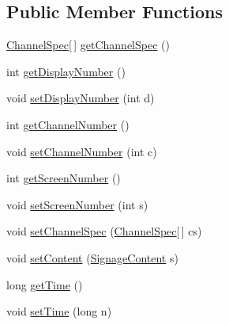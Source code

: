 \subsection*{Public Member Functions}
\begin{DoxyCompactItemize}
\item 
\hyperlink{classgov_1_1fnal_1_1ppd_1_1dd_1_1xml_1_1ChannelSpec}{Channel\-Spec}\mbox{[}$\,$\mbox{]} \hyperlink{classgov_1_1fnal_1_1ppd_1_1dd_1_1xml_1_1messages_1_1ChangeChannelList_a7da8be90ecdb39b66ba0b5ae66253b72}{get\-Channel\-Spec} ()
\item 
int \hyperlink{classgov_1_1fnal_1_1ppd_1_1dd_1_1xml_1_1messages_1_1ChangeChannelList_a96668d3be5e39ac6e37be224a0b63591}{get\-Display\-Number} ()
\item 
void \hyperlink{classgov_1_1fnal_1_1ppd_1_1dd_1_1xml_1_1messages_1_1ChangeChannelList_a141aa913bf220bb3a0e22f8cb40f210a}{set\-Display\-Number} (int d)
\item 
int \hyperlink{classgov_1_1fnal_1_1ppd_1_1dd_1_1xml_1_1messages_1_1ChangeChannelList_affc63645537a2e4dac528c63541e5b6d}{get\-Channel\-Number} ()
\item 
void \hyperlink{classgov_1_1fnal_1_1ppd_1_1dd_1_1xml_1_1messages_1_1ChangeChannelList_ab105dae5ad56c0ec2d0076f4a327d93c}{set\-Channel\-Number} (int c)
\item 
int \hyperlink{classgov_1_1fnal_1_1ppd_1_1dd_1_1xml_1_1messages_1_1ChangeChannelList_a76217fa784b8aaab72b79c05ea7781ca}{get\-Screen\-Number} ()
\item 
void \hyperlink{classgov_1_1fnal_1_1ppd_1_1dd_1_1xml_1_1messages_1_1ChangeChannelList_ad609ecfe6b9daf528517d932a37af621}{set\-Screen\-Number} (int s)
\item 
void \hyperlink{classgov_1_1fnal_1_1ppd_1_1dd_1_1xml_1_1messages_1_1ChangeChannelList_a200bcb9173148480fd4baf452e1a7728}{set\-Channel\-Spec} (\hyperlink{classgov_1_1fnal_1_1ppd_1_1dd_1_1xml_1_1ChannelSpec}{Channel\-Spec}\mbox{[}$\,$\mbox{]} cs)
\item 
void \hyperlink{classgov_1_1fnal_1_1ppd_1_1dd_1_1xml_1_1messages_1_1ChangeChannelList_abbe6bcc4962e76799207648e335ac579}{set\-Content} (\hyperlink{interfacegov_1_1fnal_1_1ppd_1_1dd_1_1signage_1_1SignageContent}{Signage\-Content} s)
\item 
long \hyperlink{classgov_1_1fnal_1_1ppd_1_1dd_1_1xml_1_1messages_1_1ChangeChannelList_a08ad85e611762cb86e939ad1e8f40669}{get\-Time} ()
\item 
void \hyperlink{classgov_1_1fnal_1_1ppd_1_1dd_1_1xml_1_1messages_1_1ChangeChannelList_a883de8f6be08fee4712a9a284dcd194a}{set\-Time} (long n)

\end{DoxyCompactItemize}
